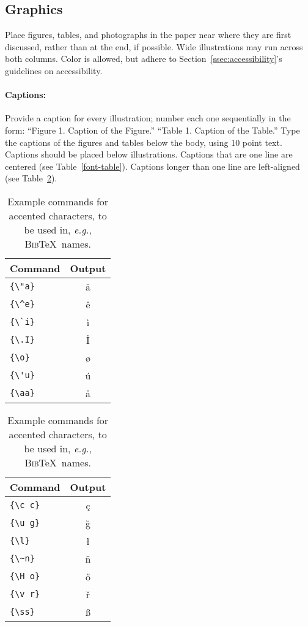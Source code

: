 \documentclass[11pt,a4paper]{article}
\newcommand\BibTeX{B\textsc{ib}\TeX}
\begin{document}
	\subsection{Graphics}
	
	Place figures, tables, and photographs in the paper near where they are first discussed, rather than at the end, if possible.
	Wide illustrations may run across both columns.
	Color is allowed, but adhere to Section~\ref{ssec:accessibility}'s guidelines on accessibility.
	
	\paragraph{Captions:}
	Provide a caption for every illustration; number each one sequentially in the form:
	``Figure 1. Caption of the Figure.''
	``Table 1. Caption of the Table.''
	Type the captions of the figures and tables below the body, using 10 point text.
	Captions should be placed below illustrations.
	Captions that are one line are centered (see Table~\ref{font-table}).
	Captions longer than one line are left-aligned (see Table~\ref{tab:accents}).
	
	\begin{table}
		\centering
		\begin{tabular}{lc}
			\hline
			\textbf{Command} & \textbf{Output}\\
			\hline
			\verb|{\"a}| & {\"a} \\
			\verb|{\^e}| & {\^e} \\
			\verb|{\`i}| & {\`i} \\ 
			\verb|{\.I}| & {\.I} \\ 
			\verb|{\o}| & {\o} \\
			\verb|{\'u}| & {\'u}  \\ 
			\verb|{\aa}| & {\aa}  \\\hline
		\end{tabular}
		\begin{tabular}{lc}
			\hline
			\textbf{Command} & \textbf{Output}\\
			\hline
			\verb|{\c c}| & {\c c} \\ 
			\verb|{\u g}| & {\u g} \\ 
			\verb|{\l}| & {\l} \\ 
			\verb|{\~n}| & {\~n} \\ 
			\verb|{\H o}| & {\H o} \\ 
			\verb|{\v r}| & {\v r} \\ 
			\verb|{\ss}| & {\ss} \\
			\hline
		\end{tabular}
		\caption{Example commands for accented characters, to be used in, \emph{e.g.}, \BibTeX\ names.}\label{tab:accents}
	\end{table}
	
\end{document}
